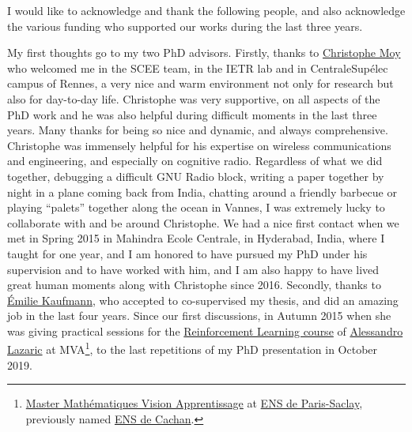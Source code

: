 
\begin{acknowledgements}


I would like to acknowledge and thank the following people, and also acknowledge the various funding who supported our works during the last three years.

My first thoughts go to my two PhD advisors.
%
Firstly, thanks to \href{https://MoyChristophe.Wordpress.com/}{Christophe Moy} who welcomed me in the SCEE team, in the IETR lab and in CentraleSupélec campus of Rennes, a very nice and warm environment not only for research but also for day-to-day life.
Christophe was very supportive, on all aspects of the PhD work and he was also helpful during difficult moments in the last three years. Many thanks for being so nice and dynamic, and always comprehensive.
Christophe was immensely helpful for his expertise on wireless communications and engineering, and especially on cognitive radio.
Regardless of what we did together, debugging a difficult GNU Radio block, writing a paper together by night in a plane coming back from India, chatting around a friendly barbecue or playing ``palets'' together along the ocean in Vannes, I was extremely lucky to collaborate with and be around Christophe.
We had a nice first contact when we met in Spring 2015 in Mahindra Ecole Centrale, in Hyderabad, India, where I taught for one year, and I am honored to have pursued my PhD under his supervision and to have worked with him, and I am also happy to have lived great human moments along with Christophe since 2016.
%
Secondly, thanks to \href{http://chercheurs.lille.inria.fr/ekaufman/research.html}{Émilie Kaufmann}, who accepted to co-supervised my thesis, and did an amazing job in the last four years. Since our first discussions, in Autumn 2015 when she was giving practical sessions for the \href{http://researchers.lille.inria.fr/~lazaric/Webpage/MVA-RL_Course15.html}{Reinforcement Learning course} of \href{http://researchers.lille.inria.fr/~lazaric/}{Alessandro Lazaric} at MVA\footnote{\href{http://math.ens-paris-saclay.fr/version-francaise/formations/master-mva/}{Master Mathématiques Vision Apprentissage} at \href{https://www.ens-paris-saclay.fr/}{ENS de Paris-Saclay}, previously named \href{https://www.ens-cachan.fr}{ENS de Cachan}.}, to the last repetitions of my PhD presentation in October 2019.

\end{acknowledgements}
